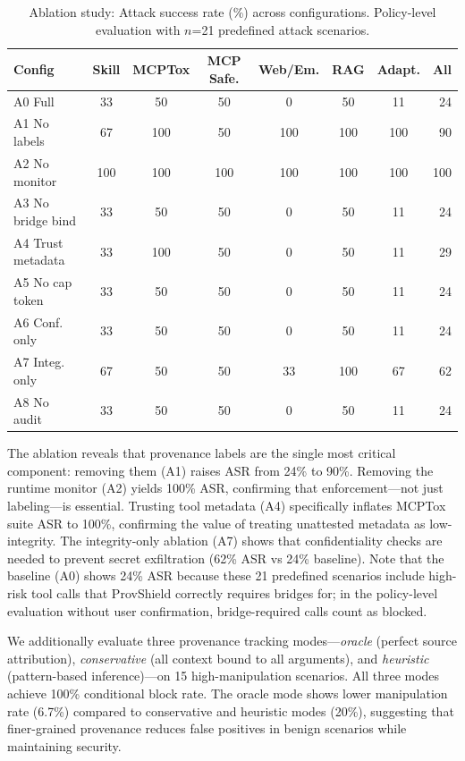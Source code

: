 \documentclass[sigconf,anonymous,review]{acmart}
\begin{document}
\begin{table}[t]
  \centering
  \caption{Ablation study: Attack success rate (\%) across configurations. Policy-level evaluation with $n$=21 predefined attack scenarios.}
  \label{tab:ablation}
  \small
  \begin{tabular}{@{}lccccccr@{}}
    \toprule
    \textbf{Config} & \textbf{Skill} & \textbf{MCPTox} & \textbf{MCP Safe.} & \textbf{Web/Em.} & \textbf{RAG} & \textbf{Adapt.} & \textbf{All} \\
    \midrule
    A0 Full            & 33 & 50  & 50 & 0  & 50 & 11 & 24 \\
    A1 No labels       & 67 & 100 & 50 & 100& 100& 100& 90 \\
    A2 No monitor      & 100& 100 & 100& 100& 100& 100& 100\\
    A3 No bridge bind  & 33 & 50  & 50 & 0  & 50 & 11 & 24 \\
    A4 Trust metadata  & 33 & 100 & 50 & 0  & 50 & 11 & 29 \\
    A5 No cap token    & 33 & 50  & 50 & 0  & 50 & 11 & 24 \\
    A6 Conf. only      & 33 & 50  & 50 & 0  & 50 & 11 & 24 \\
    A7 Integ. only     & 67 & 50  & 50 & 33 & 100& 67 & 62 \\
    A8 No audit        & 33 & 50  & 50 & 0  & 50 & 11 & 24 \\
    \bottomrule
  \end{tabular}
\end{table}


The ablation reveals that provenance labels are the single most critical component: removing them (A1) raises ASR from 24\% to 90\%. Removing the runtime monitor (A2) yields 100\% ASR, confirming that enforcement---not just labeling---is essential. Trusting tool metadata (A4) specifically inflates MCPTox suite ASR to 100\%, confirming the value of treating unattested metadata as low-integrity. The integrity-only ablation (A7) shows that confidentiality checks are needed to prevent secret exfiltration (62\% ASR vs 24\% baseline). Note that the baseline (A0) shows 24\% ASR because these 21 predefined scenarios include high-risk tool calls that ProvShield correctly requires bridges for; in the policy-level evaluation without user confirmation, bridge-required calls count as blocked.

We additionally evaluate three provenance tracking modes---\emph{oracle} (perfect source attribution), \emph{conservative} (all context bound to all arguments), and \emph{heuristic} (pattern-based inference)---on 15 high-manipulation scenarios. All three modes achieve 100\% conditional block rate. The oracle mode shows lower manipulation rate (6.7\%) compared to conservative and heuristic modes (20\%), suggesting that finer-grained provenance reduces false positives in benign scenarios while maintaining security.
\end{document}
